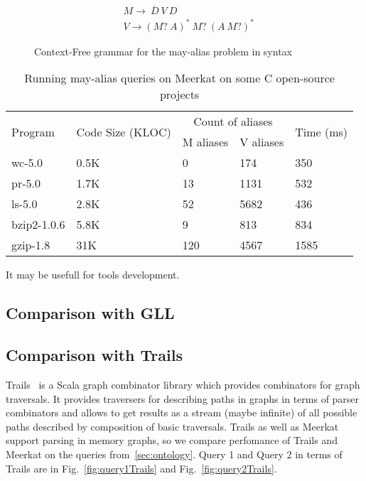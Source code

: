 \begin{figure}[t]
\begin{align*}
& M \rightarrow\ \overline{D}\ V\ D\\
& V \rightarrow (M ?\ A)^{*} \ M?\ (A\ M?)^{*}
\end{align*}
\caption{Context-Free grammar for the may-alias problem in syntax}
\label{lst:aliasGrammar}
\end{figure}



\begin{table}[t]
\centering
\begin{tabular}{|l|l|ll|l|}
\hline
\multirow{2}{*}{Program} & \multirow{2}{*}{Code Size (KLOC)} & \multicolumn{2}{c|}{Count of aliases} & \multirow{2}{*}{Time (ms)} \\ \cline{3-4}
 &  & \multicolumn{1}{c|}{M aliases} & \multicolumn{1}{c|}{V aliases} &  \\ 
\hline
\hline
wc-5.0      & 0.5K & 0   & 174  & 350 \\
pr-5.0      & 1.7K & 13  & 1131 & 532 \\
ls-5.0      & 2.8K & 52  & 5682 & 436 \\
bzip2-1.0.6 & 5.8K & 9   & 813  & 834 \\
gzip-1.8    & 31K  & 120 & 4567 & 1585\\
\hline
\end{tabular}
\caption{Running may-alias queries on Meerkat on some C open-source projects}
\label{table:staticAnalysis}
\end{table}

It may be usefull for tools development.

\subsection{Comparison with GLL}

\subsection{Comparison with Trails}

Trails~\cite{ScalaGraphParsing} is a Scala graph combinator library which provides combinators for graph traversals.
It provides traversers for describing paths in graphs in terms of parser combinators and allows to get results as a stream (maybe infinite) of all possible paths described by composition of basic traversals.
Trails as well as Meerkat support parsing in memory graphs, so we compare perfomance of Trails and Meerkat on the queries from~\autoref{sec:ontology}.
Query 1 and Query 2 in terms of Trails are in Fig.~\ref{fig:query1Trails} and Fig.~\ref{fig:query2Trails}.

